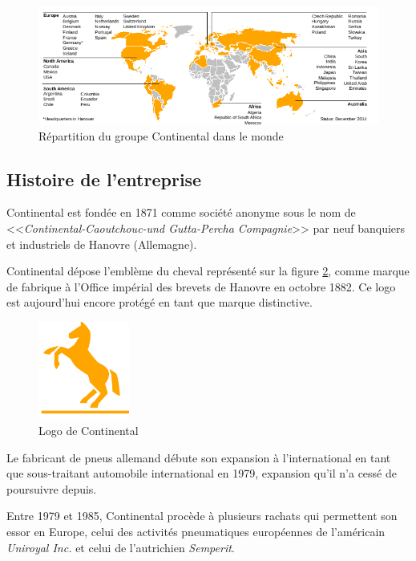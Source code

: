 		 \begin{figure}[H]
		 	\centering
		 	\includegraphics[width=18cm]{contents/images/repartitionConti.png}
		 	\caption{Répartition du groupe Continental dans le monde}
		 	\label{fig:repartitionConti}
		 \end{figure}		 

		\subsection{Histoire de l'entreprise}
		Continental est fondée en 1871 comme société anonyme sous le nom de <<\textit{Continental-Caoutchouc-und Gutta-Percha Compagnie}>> par neuf banquiers et industriels de Hanovre (Allemagne).

		Continental dépose l'emblème du cheval représenté sur la figure \ref{fig:logo}, comme marque de fabrique à l'Office impérial des brevets de Hanovre en octobre 1882. Ce logo est aujourd'hui encore protégé en tant que marque distinctive.
		\begin{figure}[H]
			\centering
			\includegraphics[width=3cm]{contents/images/logoConti.png}
			\caption{Logo de Continental}
			\label{fig:logo}
		\end{figure}

		Le fabricant de pneus allemand débute son expansion à l'international en tant que sous-traitant automobile international en 1979, expansion qu'il n'a cessé de poursuivre depuis.
		
Entre 1979 et 1985, Continental procède à plusieurs rachats qui permettent son essor en Europe, celui des activités pneumatiques européennes de l'américain \textit{Uniroyal Inc.} et celui de l'autrichien \textit{Semperit}.

